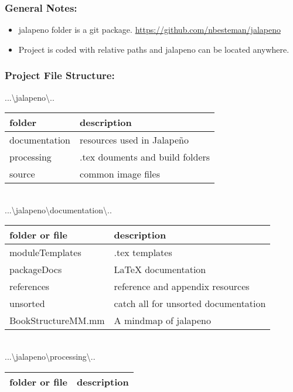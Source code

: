 \subsubsection{General Notes:}
\begin{itemize}
\item jalapeno folder is a git package.
\href{https://github.com/nbesteman/jalapeno}{https://github.com/nbesteman/jalapeno}
\item Project is coded with relative paths and jalapeno can be located anywhere.
\end{itemize}
\begin{adjmulticols}{1}{\innerMar}{\outerMar}
\subsubsection{Project File Structure:}
{\Large ...\textbackslash jalapeno\textbackslash..}\\
\begin{tabular}{p{6cm}| p{9cm} }
\footnotesize folder & {\footnotesize description} \\ \hline
documentation & resources used in Jalape\~no\\
processing & .tex douments and build folders\\
source & common image files\\
\end{tabular}
\bigskip\\
{\Large ...\textbackslash jalapeno\textbackslash documentation\textbackslash..}\\
\begin{tabular}{p{6cm} | p{9cm} }
\footnotesize folder or file & {\footnotesize description} \\ \hline
moduleTemplates & .tex templates\\
packageDocs & \LaTeX{} documentation\\
references & reference and appendix resources\\
unsorted & catch all for unsorted documentation\\
BookStructureMM.mm & A mindmap of jalapeno\\
\end{tabular}
\bigskip\\
{\Large ...\textbackslash jalapeno\textbackslash processing\textbackslash..}\\
\begin{tabular}{p{6cm}| p{9cm} }
\footnotesize folder or file & {\footnotesize description }\\ \hline

\end{tabular}
\end{adjmulticols}
